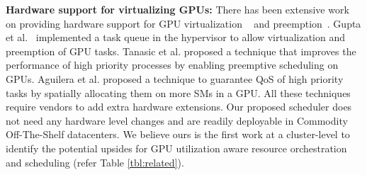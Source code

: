 \noindent\textbf{Hardware support for virtualizing GPUs:}
There has been extensive work on providing hardware support for GPU virtualization ~\cite{Gupta:2011:PCS:2002181.2002184,hong2017gpu} and preemption~\cite{Park:2015:CCP:2694344.2694346,Sajjapongse:2013:PRE:2493123.2462911}. 
Gupta et al.~\cite{Gupta:2011:PCS:2002181.2002184} implemented a task queue in the hypervisor to allow virtualization and preemption of GPU tasks.
Tanasic et al. \cite{Tanasic:2014:EPM:2665671.2665702}  proposed a technique
that improves the performance of high priority processes by enabling preemptive scheduling on GPUs. Aguilera et al. \cite{6742976} proposed a technique to guarantee QoS of high priority tasks by spatially allocating them on more SMs in a GPU. All these techniques require vendors to add extra hardware extensions. Our proposed scheduler does not need any hardware level changes and are readily deployable in Commodity Off-The-Shelf datacenters. We believe ours is the first work at a cluster-level to identify the potential upsides for GPU utilization aware resource orchestration and scheduling (refer Table \ref{tbl:related}).


